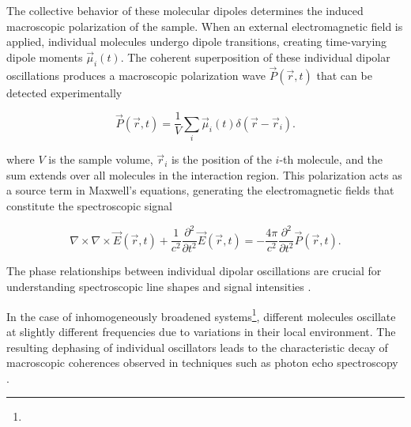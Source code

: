 \noindent 
The collective behavior of these molecular dipoles determines the induced macroscopic polarization of the sample. When an external electromagnetic field is applied, individual molecules undergo dipole transitions, creating time-varying dipole moments $\vec{\mu}_i(t)$. The coherent superposition of these individual dipolar oscillations produces a macroscopic polarization wave $\vec{P}(\vec{r}, t)$ that can be detected experimentally

\begin{equation}
	\vec{P}(\vec{r}, t) = \frac{1}{V} \sum_{i} \vec{\mu}_i(t) \delta(\vec{r} - \vec{r}_i).
	\label{eq:macroscopic_polarization}
\end{equation}

\noindent 
where $V$ is the sample volume, $\vec{r}_i$ is the position of the $i$-th molecule, and the sum extends over all molecules in the interaction region. This polarization acts as a source term in Maxwell's equations, generating the electromagnetic fields that constitute the spectroscopic signal \cite{abramaviciusetal2009coherentmultidimensionaloptical}

\begin{equation}
	\nabla \times \nabla \times \vec{E}(\vec{r}, t) + \frac{1}{c^2} \frac{\partial^2}{\partial t^2} \vec{E}(\vec{r}, t) = - \frac{4 \pi}{c^2} \frac{\partial^2}{\partial t^2} \vec{P}(\vec{r}, t).
\end{equation}

\noindent
{}

\noindent 
The phase relationships between individual dipolar oscillations are crucial for understanding spectroscopic line shapes and signal intensities  . 

In the case of inhomogeneously broadened systems\footnote{}, different molecules oscillate at slightly different frequencies due to variations in their local environment. The resulting dephasing of individual oscillators leads to the characteristic decay of macroscopic coherences observed in techniques such as photon echo spectroscopy \cite{mukamel1995principlesnonlinearoptical}.



